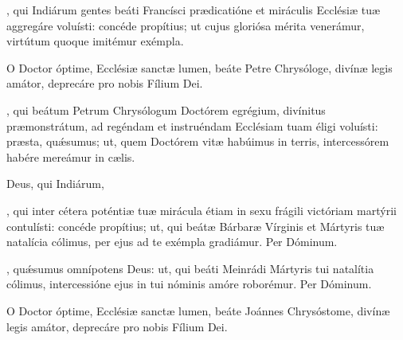 \documentclass[fontsize=9pt,paper=A6,twoside,BCOR=1mm,DIV=22,headinclude]{scrarticle}
\renewcommand\A\Ant
\begin{document}
\begin{multicols}{2}
{\Te


\AiC 

\VRCii 

, qui Indiárum gentes beáti Francísci prædicatióne et miráculis Ecclésiæ tuæ aggregáre voluísti: concéde propítius; ut cujus gloriósa mérita venerámur, virtútum quoque imitémur exémpla.



\A O Doctor óptime, Ecclésiæ sanctæ lumen, beáte Petre Chrysóloge, divínæ legis amátor, deprecáre pro nobis Fílium Dei.

\VRCi 

, qui beátum Petrum Chrysólogum Doctórem egrégium, divínitus præmonstrátum, ad regéndam et instruéndam Ecclésiam tuam éligi voluísti: præsta, quǽsumus; ut, quem Doctórem vitæ habúimus in terris, intercessórem habére mereámur in cælis.


\AiiiC 

\VRCiv

 Deus, qui Indiárum, 



\AiV 

\VRVi 

, qui inter cétera poténtiæ tuæ mirácula étiam in sexu frágili victóriam martýrii contulísti: concéde propítius; ut, qui beátæ Bárbaræ Vírginis et Mártyris tuæ natalícia cólimus, per ejus ad te exémpla gradiámur.
Per Dóminum.

}




\VRMi 

\MiM

, qu\'æsumus omnípotens Deus: ut, qui beáti Meinrádi Mártyris tui natalítia cólimus, intercessióne ejus in tui nóminis amóre roborémur. Per Dóminum.


\A O Doctor óptime, Ecclésiæ sanctæ lumen, beáte Joánnes Chrysóstome, divínæ legis amátor, deprecáre pro nobis Fílium Dei.


\end{multicols}
\end{document}
